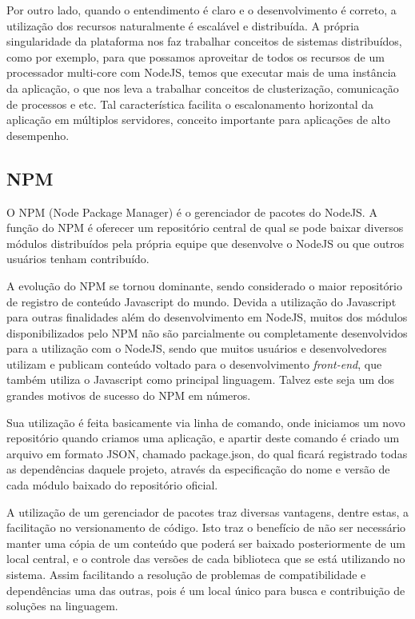 Por outro lado, quando o entendimento é claro e o desenvolvimento é correto, a utilização dos recursos naturalmente é escalável e distribuída. A própria singularidade da plataforma nos faz trabalhar conceitos de sistemas distribuídos, como por exemplo, para que possamos aproveitar de todos os recursos de um processador multi-core com NodeJS, temos que executar mais de uma instância da aplicação, o que nos leva a trabalhar conceitos de clusterização, comunicação de processos e etc. Tal característica facilita o escalonamento horizontal da aplicação em múltiplos servidores, conceito importante para aplicações de alto desempenho.

\subsection{NPM}
O NPM (Node Package Manager) \cite{npm} é o gerenciador de pacotes do NodeJS. A função do NPM é oferecer um repositório central de qual se pode baixar diversos módulos distribuídos pela própria equipe que desenvolve o NodeJS ou que outros usuários tenham contribuído.

A evolução do NPM se tornou dominante, sendo considerado o maior repositório de registro de conteúdo Javascript do mundo. Devida a utilização do Javascript para outras finalidades além do desenvolvimento em NodeJS, muitos dos módulos disponibilizados pelo NPM não são parcialmente ou completamente desenvolvidos para a utilização com o NodeJS, sendo que muitos usuários e desenvolvedores utilizam e publicam conteúdo voltado para o desenvolvimento \textit{front-end}, que também utiliza o Javascript como principal linguagem. Talvez este seja um dos grandes motivos de sucesso do NPM em números.

Sua utilização é feita basicamente via linha de comando, onde iniciamos um novo repositório quando criamos uma aplicação, e apartir deste comando é criado um arquivo em formato JSON, chamado package.json, do qual ficará registrado todas as dependências daquele projeto, através da especificação do nome e versão de cada módulo baixado do repositório oficial.

A utilização de um gerenciador de pacotes traz diversas vantagens, dentre estas, a facilitação no versionamento de código. Isto traz o benefício de não ser necessário manter uma cópia de um conteúdo que poderá ser baixado posteriormente de um local central, e o controle das versões de cada biblioteca que se está utilizando no sistema. Assim facilitando a resolução de problemas de compatibilidade e dependências uma das outras, pois é um local único para busca e contribuição de soluções na linguagem.


